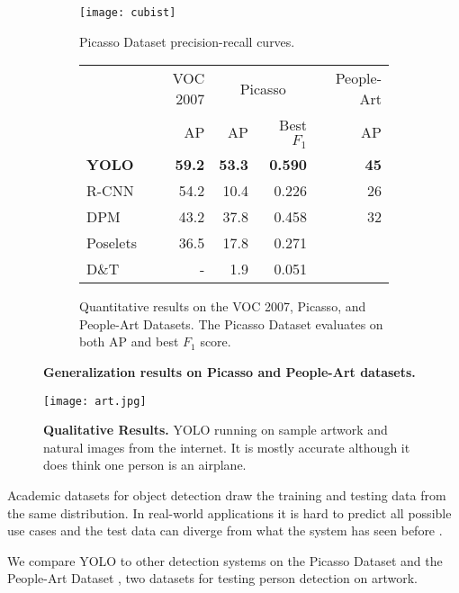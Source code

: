 \begin{figure*}
\centering
\begin{subfigure}[b]{.45\textwidth}
 \centering
 \texttt{[image: cubist]}
 \caption{\small Picasso Dataset precision-recall curves.}
\end{subfigure}
\begin{subfigure}[b]{.55\textwidth}
 \centering
 \begin{tabular}{l|r|rr|r}
& VOC 2007 & \multicolumn{2}{c|}{Picasso} & People-Art\\
 & AP & AP & Best $F_1$ & AP\\
\hline
\textbf{YOLO} & \textbf{59.2} & \textbf{53.3} & \textbf{0.590} & \textbf{45}\\
R-CNN & 54.2 & 10.4 & 0.226 & 26\\
DPM & 43.2 & 37.8 & 0.458 & 32\\
Poselets \cite{BourdevMalikICCV09} & 36.5 & 17.8 & 0.271 \\
D\&T \cite{dalal2005histograms} & - & 1.9 & 0.051 \\
\end{tabular}
\caption{\small Quantitative results on the VOC 2007, Picasso, and People-Art Datasets. The Picasso Dataset evaluates on both AP and best $F_1$ score.}
\end{subfigure}
\caption{\small \textbf{Generalization results on Picasso and People-Art datasets.}}
\label{art}
\end{figure*}

\begin{figure*}[t]
\begin{center}
 \texttt{[image: art.jpg]}
\end{center}
 \caption{\small \textbf{Qualitative Results.} YOLO running on sample artwork and natural images from the internet. It is mostly accurate although it does think one person is an airplane.}
\label{images}
\end{figure*}

Academic datasets for object detection draw the training and testing data from the same distribution. In real-world applications it is hard to predict all possible use cases and the test data can diverge from what the system has seen before \cite{cai2015cross}. 

We compare YOLO to other detection systems on the Picasso Dataset \cite{ginosar2014detecting} and the People-Art Dataset \cite{cai2015cross}, two datasets for testing person detection on artwork.

